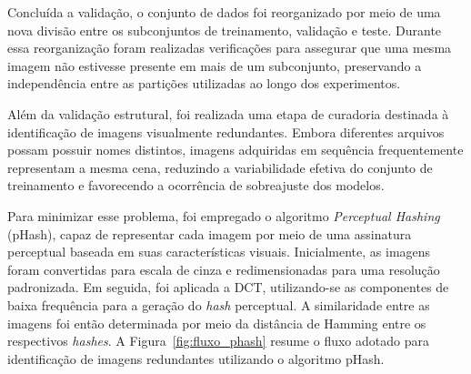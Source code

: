 \documentclass[artigo,times,capa]{iftex2024}
\begin{document}
Concluída a validação, o conjunto de dados foi reorganizado por meio de uma nova
divisão entre os subconjuntos de treinamento, validação e teste. Durante essa
reorganização foram realizadas verificações para assegurar que uma mesma imagem
não estivesse presente em mais de um subconjunto, preservando a independência
entre as partições utilizadas ao longo dos experimentos.

Além da validação estrutural, foi realizada uma etapa de curadoria destinada à identificação de imagens visualmente redundantes. Embora diferentes arquivos possam possuir nomes distintos, imagens adquiridas em sequência frequentemente representam a mesma cena, reduzindo a variabilidade efetiva do conjunto de treinamento e favorecendo a ocorrência de sobreajuste dos modelos.

Para minimizar esse problema, foi empregado o algoritmo \textit{Perceptual Hashing} (pHash), capaz de representar cada imagem por meio de uma assinatura perceptual baseada em suas características visuais. Inicialmente, as imagens foram convertidas para escala de cinza e redimensionadas para uma resolução padronizada. Em seguida, foi aplicada a \ac{DCT}, utilizando-se as componentes de baixa frequência para a geração do \textit{hash} perceptual. A similaridade entre as imagens foi então determinada por meio da distância de Hamming entre os respectivos \textit{hashes}. A Figura~\ref{fig:fluxo_phash} resume o fluxo adotado para identificação de imagens redundantes utilizando o algoritmo pHash.
\end{document}
